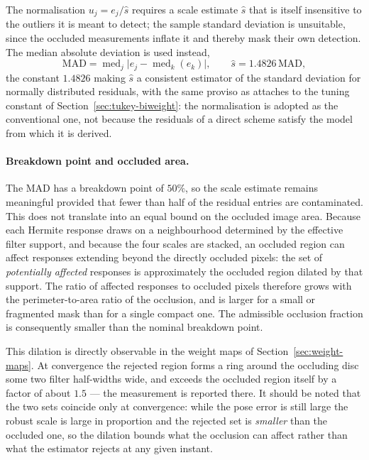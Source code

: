 The normalisation $u_{j}=e_{j}/\hat{s}$ requires a scale estimate $\hat{s}$
that is itself insensitive to the outliers it is meant to detect; the sample
standard deviation is unsuitable, since the occluded measurements inflate it
and thereby mask their own detection. The median absolute deviation is used
instead,
\begin{equation}
    \mathrm{MAD}=\operatorname{med}_{j}\bigl\lvert e_{j}-\operatorname{med}_{k}(e_{k})\bigr\rvert,
    \qquad
    \hat{s}=1.4826\,\mathrm{MAD},
    \label{eq:mad}
\end{equation}
the constant $1.4826$ making $\hat{s}$ a consistent estimator of the standard
deviation for normally distributed residuals, with the same proviso as
attaches to the tuning constant of Section~\ref{sec:tukey-biweight}: the
normalisation is adopted as the conventional one, not because the residuals
of a direct scheme satisfy the model from which it is derived.

\paragraph{Breakdown point and occluded area.}
The MAD has a breakdown point of $50\%$, so the scale estimate remains
meaningful provided that fewer than half of the residual entries are
contaminated. This does not translate into an equal bound on the occluded
image area. Because each Hermite response draws on a neighbourhood determined
by the effective filter support, and because the four scales are stacked, an
occluded region can affect responses extending beyond the directly occluded
pixels: the set of \emph{potentially affected} responses is approximately the
occluded region dilated by that support. The ratio of affected responses to
occluded pixels therefore grows with the perimeter-to-area ratio of the
occlusion, and is larger for a small or fragmented mask than for a single
compact one. The admissible occlusion fraction is consequently smaller than
the nominal breakdown point.

This dilation is directly observable in the weight maps of
Section~\ref{sec:weight-maps}. At convergence the rejected region forms a
ring around the occluding disc some two filter half-widths wide, and exceeds
the occluded region itself by a factor of about $1.5$ --- the measurement is
reported there. It should be noted that the two sets coincide only at
convergence: while the pose error is still large the robust scale is large in
proportion and the rejected set is \emph{smaller} than the occluded one, so
the dilation bounds what the occlusion can affect rather than what the
estimator rejects at any given instant.

